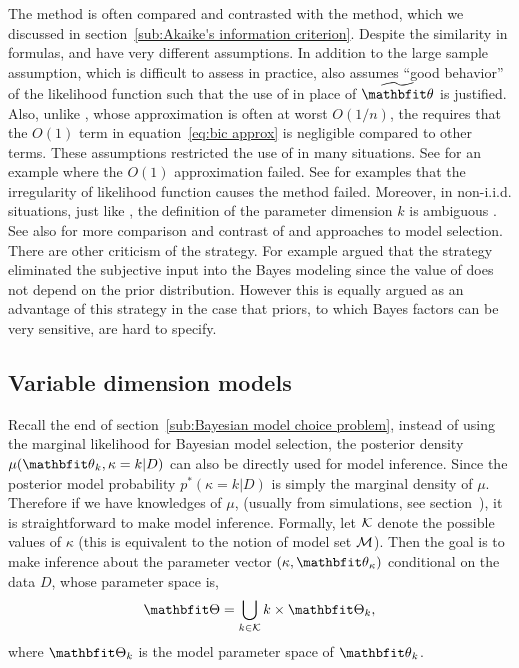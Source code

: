 \documentclass[10pt, hyper, bib, fontset=Lucida,
linespread=1.3, typearearatio=0.75]{marticle}
\begin{document}
The \bic method is often compared and contrasted with the \aic method, which
we discussed in section~\ref{sub:Akaike's information criterion}. Despite the
similarity in formulas, \aic and \bic have very different assumptions. In
addition to the large sample assumption, which is difficult to assess in
practice, \bic also assumes ``good behavior'' of the likelihood function such
that the use of \mle in place of $\tbth$ is justified. Also, unlike \aic,
whose approximation is often at worst $O(1/n)$, the \bic requires that the
$O(1)$ term in equation~\eqref{eq:bic approx} is negligible compared to other
terms. These assumptions restricted the use of \bic in many situations. See
\textcite{Gelfand:1994ux} for an example where the $O(1)$ approximation failed.
See \textcite{Berger:2001uy} for examples that the irregularity of likelihood
function causes the \bic method failed. Moreover, in non-i.i.d. situations,
just like \aic, the definition of the parameter dimension $k$ is ambiguous
\parencite{Spiegelhalter:1998uc, Kass:1995vb}. See also \textcite[][chap.~5
and chap.~6]{Burnham:2002wc} for more comparison and contrast of \aic and \bic
approaches to model selection. There are other criticism of the \bic strategy.
For example \textcite[][chap.~7]{Robert:2007tc} argued that the \bic strategy
eliminated the subjective input into the Bayes modeling since the value of
\bic does not depend on the prior distribution. However this is equally argued
as an advantage of this strategy in the case that priors, to which Bayes
factors can be very sensitive, are hard to specify.

\subsection{Variable dimension models}
\label{sub:Variable dimension models}

Recall the end of section~\ref{sub:Bayesian model choice problem}, instead of
using the marginal likelihood for Bayesian model selection, the posterior
density $\mu(\bth_k,\kappa=k|D)$ can also be directly used for model
inference. Since the posterior model probability $p^*(\kappa=k|D)$ is simply
the marginal density of $\mu$. Therefore if we have knowledges of $\mu$,
(usually from simulations, see section~), it is
straightforward to make model inference. Formally, let $\mathcal{K}$ denote the
possible values of $\kappa$ (this is equivalent to the notion of model set
$\mathcal{M}$). Then the goal is to make inference about the parameter vector
$(\kappa, \bth_{\kappa})$ conditional on the data $D$, whose parameter space
is,
\begin{equation}
  \bTh = \bigcup_{k\in\calK}{k}\times\bTh_k,
  \label{eq:variable dimension parameter space}
\end{equation}
where $\bTh_k$ is the model parameter space of $\bth_k$.
\end{document}
